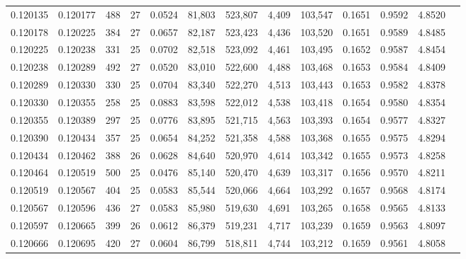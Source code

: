 \begin{tabular}{rrrrrrrrrrrrr}
0.120135 & 0.120177 & 488 &  27 &                                     0.0524 &  81,803 & 523,807 &   4,409 & 103,547 & 0.1651 & 0.9592 & 4.8520 \\
0.120178 & 0.120225 & 384 &  27 &                                     0.0657 &  82,187 & 523,423 &   4,436 & 103,520 & 0.1651 & 0.9589 & 4.8485 \\
0.120225 & 0.120238 & 331 &  25 &                                     0.0702 &  82,518 & 523,092 &   4,461 & 103,495 & 0.1652 & 0.9587 & 4.8454 \\
0.120238 & 0.120289 & 492 &  27 &                                     0.0520 &  83,010 & 522,600 &   4,488 & 103,468 & 0.1653 & 0.9584 & 4.8409 \\
0.120289 & 0.120330 & 330 &  25 &                                     0.0704 &  83,340 & 522,270 &   4,513 & 103,443 & 0.1653 & 0.9582 & 4.8378 \\
0.120330 & 0.120355 & 258 &  25 &                                     0.0883 &  83,598 & 522,012 &   4,538 & 103,418 & 0.1654 & 0.9580 & 4.8354 \\
0.120355 & 0.120389 & 297 &  25 &                                     0.0776 &  83,895 & 521,715 &   4,563 & 103,393 & 0.1654 & 0.9577 & 4.8327 \\
0.120390 & 0.120434 & 357 &  25 &                                     0.0654 &  84,252 & 521,358 &   4,588 & 103,368 & 0.1655 & 0.9575 & 4.8294 \\
0.120434 & 0.120462 & 388 &  26 &                                     0.0628 &  84,640 & 520,970 &   4,614 & 103,342 & 0.1655 & 0.9573 & 4.8258 \\
0.120464 & 0.120519 & 500 &  25 &                                     0.0476 &  85,140 & 520,470 &   4,639 & 103,317 & 0.1656 & 0.9570 & 4.8211 \\
0.120519 & 0.120567 & 404 &  25 &                                     0.0583 &  85,544 & 520,066 &   4,664 & 103,292 & 0.1657 & 0.9568 & 4.8174 \\
0.120567 & 0.120596 & 436 &  27 &                                     0.0583 &  85,980 & 519,630 &   4,691 & 103,265 & 0.1658 & 0.9565 & 4.8133 \\
0.120597 & 0.120665 & 399 &  26 &                                     0.0612 &  86,379 & 519,231 &   4,717 & 103,239 & 0.1659 & 0.9563 & 4.8097 \\
0.120666 & 0.120695 & 420 &  27 &                                     0.0604 &  86,799 & 518,811 &   4,744 & 103,212 & 0.1659 & 0.9561 & 4.8058 \\

\end{tabular}
